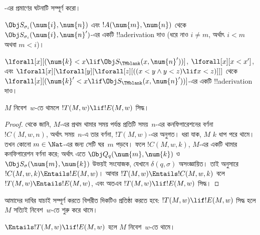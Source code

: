 \documentclass[../../../include/open-logic-section]{subfiles}
\begin{document}
\begin{prob}
-এর প্রমাণের
 ঘটনাটি সম্পূর্ণ করো।
\end{prob}

\begin{prob}
$\Obj S_{\sigma_i}(\num{i},\num{n})$ এবং
$!A(\num{m},\num{n})$ থেকে
$\Obj S_{\sigma_i}(\num{i},\num{n}')$-এর একটি !!a{derivation} দাও
(ধরে নাও $i\neq m$, অর্থাৎ $i<m$ অথবা $m<i$)।

\end{prob}

\begin{prob}
$\lforall[x][(\num{k}<x\lif\Obj S_\TMblank(x,\num{n}'))]$,
$\lforall[x][x<x']$, এবং
$\lforall[x][\lforall[y][\lforall[z][((x<y\land y<z)\lif x<z)]]]$
থেকে
$\lforall[x][(\num{k}'<x\lif\Obj S_\TMblank(x,\num{n}'))]$-এর একটি
!!a{derivation} দাও।

\end{prob}

\begin{lem}
$M$ নিবেশ~$w$-তে থামলে $!T(M,w)\lif !E(M,w)$ সিদ্ধ।
\end{lem}

\begin{proof}
 থেকে জানি, $M$-এর প্রথম থামার সময় পর্যন্ত প্রতিটি
সময়~$n$-এর কনফিগারেশনের বর্ণনা~$!C(M,w,n)$, অর্থাৎ সময়~$n$-এ তার বর্ণনা,
$!T(M,w)$-এর অনুগত। ধরা যাক, $M$ $k$ ধাপ পরে থামে। তখন কোনো
$m\in\Nat$-এর জন্য সেটি ঘর~$m$ পড়বে। ফলে $!C(M,w,k)$, $M$-এর একটি
থামার কনফিগারেশন বর্ণনা করে; অর্থাৎ এতে
$\Obj Q_q(\num{m},\num{k})$ ও $\Obj S_\sigma(\num{m},\num{k})$ উভয়ই
সংযোজক, যেখানে $\delta(q,\sigma)$ অসংজ্ঞায়িত। তাই
 অনুসারে
$!C(M,w,k)\Entails !E(M,w)$। আবার
$!T(M,w)\Entails !C(M,w,k)$ বলে
$!T(M,w)\Entails !E(M,w)$, এবং অতএব $!T(M,w)\lif !E(M,w)$ সিদ্ধ।
\end{proof}

\begin{explain}
আমাদের দাবির যাচাই সম্পূর্ণ করতে বিপরীত দিকটিও প্রতিষ্ঠা করতে হবে:
$!T(M,w)\lif !E(M,w)$ সিদ্ধ হলে $M$ সত্যিই নিবেশ~$w$-তে শুরু করে থামে।
\end{explain}

\begin{lem}
$\Entails !T(M,w)\lif !E(M,w)$ হলে $M$ নিবেশ~$w$-তে থামে।
\end{lem}
\end{document}
